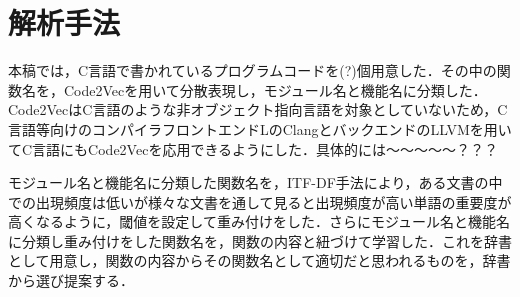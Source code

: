 \documentclass[submit]{ipsj}
\begin{document}





\section{解析手法}
本稿では，C言語で書かれているプログラムコードを(?)個用意した．その中の関数名を，Code2Vecを用いて分散表現し，モジュール名と機能名に分類した．Code2VecはC言語のような非オブジェクト指向言語を対象としていないため，C言語等向けのコンパイラフロントエンドLのClangとバックエンドのLLVMを用いてC言語にもCode2Vecを応用できるようにした．具体的には〜〜〜〜〜？？？

モジュール名と機能名に分類した関数名を，ITF-DF手法により，ある文書の中での出現頻度は低いが様々な文書を通して見ると出現頻度が高い単語の重要度が高くなるように，閾値を設定して重み付けをした．さらにモジュール名と機能名に分類し重み付けをした関数名を，関数の内容と紐づけて学習した．これを辞書として用意し，関数の内容からその関数名として適切だと思われるものを，辞書から選び提案する．
\end{document}
